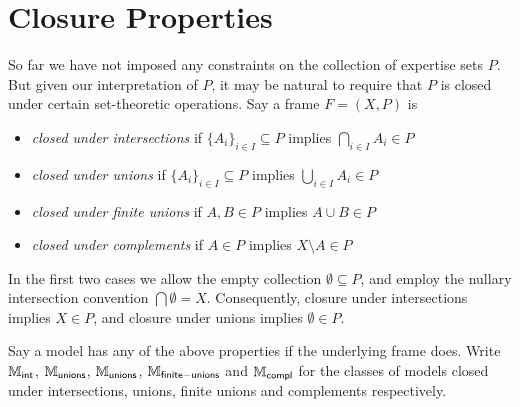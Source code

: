 \section{Closure Properties}
\label{sec_closure_properties}

So far we have not imposed any constraints on the collection of expertise sets
$P$. But given our interpretation of $P$, it may be natural to
require that $P$ is closed under certain set-theoretic operations. Say
a frame $F = (X, P)$ is

\begin{itemize}

    \item \emph{closed under intersections} if $\{A_i\}_{i \in I} \subseteq P$
          implies $\bigcap_{i \in I}{A_i} \in P$

    \item \emph{closed under unions} if $\{A_i\}_{i \in I} \subseteq P$ implies
          $\bigcup_{i \in I}{A_i} \in P$

    \item \emph{closed under finite unions} if $A, B \in P$ implies $A \cup B
          \in P$

    \item \emph{closed under complements} if $A \in P$ implies $X \setminus A
          \in P$

\end{itemize}

In the first two cases we allow the empty collection $\emptyset \subseteq P$,
and employ the nullary intersection convention $\bigcap \emptyset = X$.
Consequently, closure under intersections implies $X \in P$, and closure under
unions implies $\emptyset \in P$.

Say a model has any of the above properties if the underlying frame does. Write
$\mathbb{M}_{\mathsf{int}}$, $\mathbb{M}_{\mathsf{unions}}$, $\mathbb{M}_{\mathsf{unions}}$, $\mathbb{M}_{\mathsf{finite-unions}}$ and $\mathbb{M}_{\mathsf{compl}}$ for the classes
of models closed under intersections, unions, finite unions and complements
respectively.


